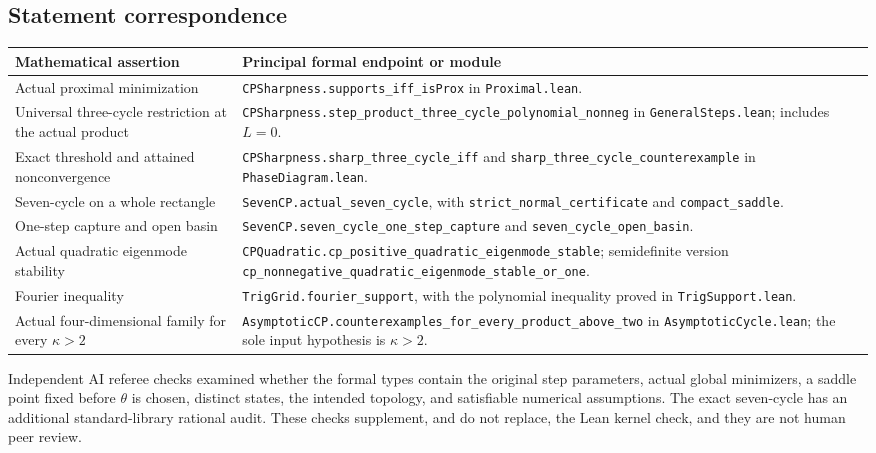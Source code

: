 \documentclass[11pt]{article}
\theoremstyle{remark}\newtheorem{remark}[theorem]{Remark}
\newcommand{\leanname}[1]{\begingroup\small\urlstyle{tt}\nolinkurl{#1}\endgroup}
\begin{document}
\newpage
\subsection{Statement correspondence}

\begin{longtable}{>{\raggedright\arraybackslash}p{}>{\raggedright\arraybackslash}p{}}
\toprule
Mathematical assertion & Principal formal endpoint or module\\
\midrule\endhead
Actual proximal minimization & \leanname{CPSharpness.supports_iff_isProx} in \texttt{Proximal.lean}.\\[4pt]
Universal three-cycle restriction at the actual product & \leanname{CPSharpness.step_product_three_cycle_polynomial_nonneg} in \texttt{GeneralSteps.lean}; includes $L=0$.\\[4pt]
Exact threshold and attained nonconvergence & \leanname{CPSharpness.sharp_three_cycle_iff} and \leanname{sharp_three_cycle_counterexample} in \texttt{PhaseDiagram.lean}.\\[4pt]
Seven-cycle on a whole rectangle & \leanname{SevenCP.actual_seven_cycle}, with \leanname{strict_normal_certificate} and \leanname{compact_saddle}.\\[4pt]
One-step capture and open basin & \leanname{SevenCP.seven_cycle_one_step_capture} and \leanname{seven_cycle_open_basin}.\\[4pt]
Actual quadratic eigenmode stability & \leanname{CPQuadratic.cp_positive_quadratic_eigenmode_stable}; semidefinite version \leanname{cp_nonnegative_quadratic_eigenmode_stable_or_one}.\\[4pt]
Fourier inequality & \leanname{TrigGrid.fourier_support}, with the polynomial inequality proved in \texttt{TrigSupport.lean}.\\[4pt]
Actual four-dimensional family for every $\kappa>2$ & \leanname{AsymptoticCP.counterexamples_for_every_product_above_two} in \texttt{AsymptoticCycle.lean}; the sole input hypothesis is $\kappa>2$.\\
\bottomrule
\end{longtable}

Independent AI referee checks examined whether the formal types contain the original step parameters, actual global minimizers, a saddle point fixed before $\theta$ is chosen, distinct states, the intended topology, and satisfiable numerical assumptions. The exact seven-cycle has an additional standard-library rational audit. These checks supplement, and do not replace, the Lean kernel check, and they are not human peer review.
\end{document}
